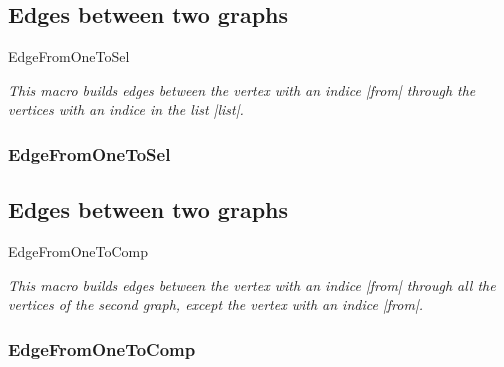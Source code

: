 \newpage
\subsection{Edges between two graphs }
\begin{NewMacroBox}{EdgeFromOneToSel}{}

\medskip
\emph{This macro  builds edges between the vertex with an indice |from| through the vertices with an indice in the list |list|.}
\end{NewMacroBox}


\subsubsection{EdgeFromOneToSel}
\begin{center}
\begin{tkzexample}
\end{tkzexample}
\end{center}

\newpage
\subsection{Edges between two graphs }
\begin{NewMacroBox}{EdgeFromOneToComp}{}

\medskip
\emph{This macro  builds edges between the vertex with an indice |from| through all the vertices of the second graph, except the vertex with an indice |from|.}
\end{NewMacroBox}

\subsubsection{EdgeFromOneToComp}
\begin{center}
\begin{tkzexample}[vbox]
\end{tkzexample}
\end{center}

